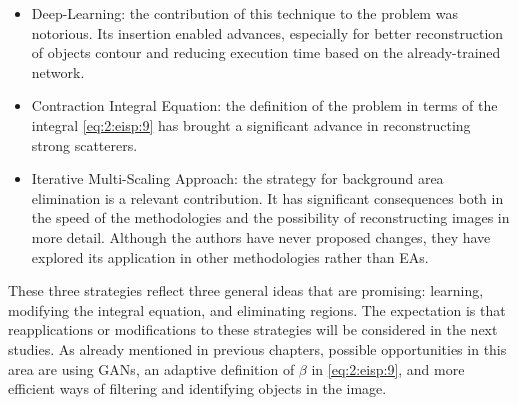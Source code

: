 		\begin{itemize}
			\item Deep-Learning: the contribution of this technique to the problem was notorious. Its insertion enabled advances, especially for better reconstruction of objects contour and reducing execution time based on the already-trained network.
			\item Contraction Integral Equation: the definition of the problem in terms of the integral \eqref{eq:2:eisp:9} has brought a significant advance in reconstructing strong scatterers.
			\item Iterative Multi-Scaling Approach: the strategy for background area elimination is a relevant contribution. It has significant consequences both in the speed of the methodologies and the possibility of reconstructing images in more detail. Although the authors have never proposed changes, they have explored its application in other methodologies rather than EAs.
		\end{itemize}
	
		These three strategies reflect three general ideas that are promising: learning, modifying the integral equation, and eliminating regions. The expectation is that reapplications or modifications to these strategies will be considered in the next studies. As already mentioned in previous chapters, possible opportunities in this area are using GANs, an adaptive definition of $\beta$ in \eqref{eq:2:eisp:9}, and more efficient ways of filtering and identifying objects in the image.
		
